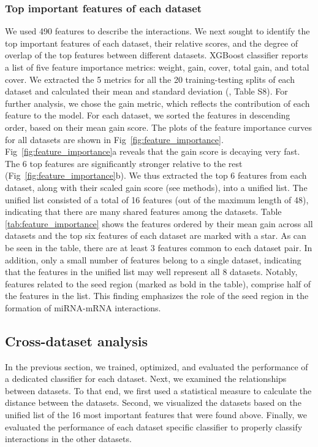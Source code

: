 \documentclass{bmcart}
\begin{document}
\subsubsection*{Top important features of each dataset}
We used 490 features to describe the interactions. We next sought to identify the top important features of each dataset, their relative scores, and the degree of overlap of the top features between different datasets. XGBoost classifier reports a list of five feature importance metrics: weight, gain, cover, total gain, and total cover. We extracted the 5 metrics for all the 20 training-testing splits of each dataset and calculated their mean and standard deviation (, Table S8).
For further analysis, we chose the gain metric, which reflects the contribution of each feature to the model. For each dataset, we sorted the features in descending order, based on their mean gain score. The plots of the feature importance curves for all datasets are shown in Fig~\ref{fig:feature_importance}.
Fig~\ref{fig:feature_importance}a reveals that the gain score is decaying very fast. The 6 top features are significantly stronger relative to the rest (Fig~\ref{fig:feature_importance}b). We thus extracted the top 6 features from each dataset, along with their scaled gain score (see methods), into a unified list. The unified list consisted of a total of 16 features (out of the maximum length of 48), indicating that there are many shared features among the datasets. Table \ref{tab:feature_importance} shows the features ordered by their mean gain across all datasets and the top six features of each dataset are marked with a star. As can be seen in the table, there are at least 3 features common to each dataset pair. In addition, only a small number of features belong to a single dataset, indicating that the features in the unified list may well represent all 8 datasets.
Notably, features related to the seed region (marked as bold in the table), comprise half of the features in the list. This finding emphasizes the role of the seed region in the formation of miRNA-mRNA interactions.



\subsection*{Cross-dataset analysis}
In the previous section, we trained, optimized, and evaluated the performance of a dedicated classifier for each dataset. Next, we examined the relationships between datasets. To that end, we first used a statistical measure to calculate the distance between the datasets. Second, we visualized the datasets based on the unified list of the 16 most important features that were found above. Finally, we evaluated the performance of each dataset specific classifier to properly classify interactions in the other datasets.
\end{document}
